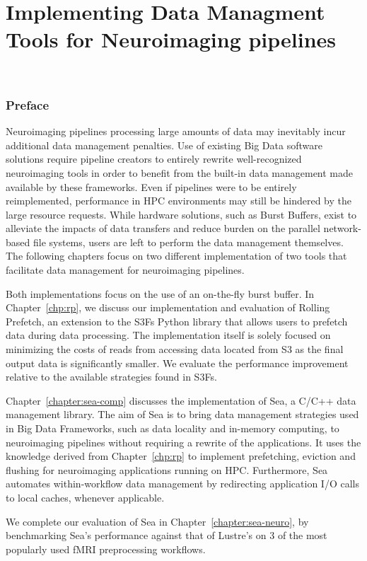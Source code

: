 \part{Implementing Data Managment Tools for Neuroimaging pipelines}~\label{part:implementation}
\section*{Preface}

Neuroimaging pipelines processing large amounts of data may inevitably incur
additional data management penalties. Use of existing Big Data software
solutions require pipeline creators to entirely rewrite well-recognized
neuroimaging tools in order to benefit from the built-in data management made
available by these frameworks. Even if pipelines were to be entirely
reimplemented, performance in HPC environments may still be hindered by the
large resource requests. While hardware solutions, such as Burst Buffers, exist
to alleviate the impacts of data transfers and reduce burden on the parallel
network-based file systems, users are left to perform the data management
themselves. The following chapters focus on two different implementation of two
tools that facilitate data management for neuroimaging pipelines. 

Both implementations focus on the use of an on-the-fly burst buffer. In
Chapter~\ref{chp:rp}, we discuss our implementation and evaluation of Rolling
Prefetch, an extension to the S3Fs Python library that allows users to prefetch
data during data processing. The implementation itself is solely focused on
minimizing the costs of reads from accessing data located from S3 as the final
output data is significantly smaller. We evaluate the performance improvement
relative to the available strategies found in S3Fs. 

Chapter~\ref{chapter:sea-comp} discusses the implementation of Sea, a C/C++ data
management library. The aim of Sea is to bring data management strategies used
in Big Data Frameworks, such as data locality and in-memory computing, to
neuroimaging pipelines without requiring a rewrite of the applications. It uses
the knowledge derived from Chapter~\ref{chp:rp} to implement prefetching,
eviction and flushing for neuroimaging applications running on HPC. Furthermore,
Sea automates within-workflow data management by redirecting application I/O
calls to local caches, whenever applicable. 

We complete our evaluation of Sea in Chapter~\ref{chapter:sea-neuro}, by
benchmarking Sea's performance against that of Lustre's on 3 of the most
popularly used fMRI preprocessing workflows.

